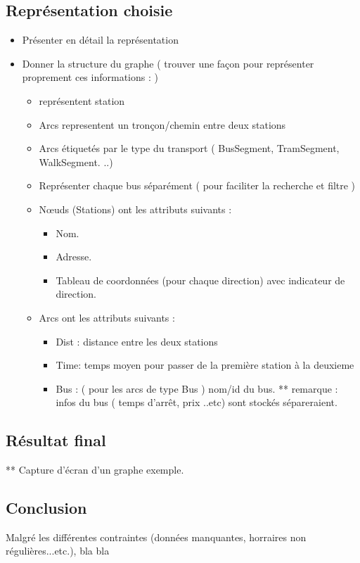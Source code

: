 \subsection{Représentation choisie}
	\begin{itemize}
	\item Présenter en détail la représentation
	\item Donner la structure du graphe ( trouver une façon pour représenter proprement ces informations : )
	\begin{itemize}
		 \item  représentent station
		 \item Arcs representent un tronçon/chemin entre deux stations
		 \item Arcs étiquetés par le type du transport ( BusSegment, TramSegment, WalkSegment. ..) 
		 \item Représenter chaque bus séparément ( pour faciliter la recherche et filtre ) 
		 \item Nœuds (Stations) ont les attributs suivants : 
		 \begin{itemize}
		 	\item Nom.
		 	\item Adresse.
		 	\item Tableau de coordonnées (pour chaque direction) avec indicateur de direction.
		 \end{itemize}
		 \item Arcs ont les attributs suivants :
		 \begin{itemize}
		 		\item Dist : distance entre les deux stations
		 		\item Time: temps moyen pour passer de la première station à la deuxieme
		 		\item Bus : ( pour les arcs de type Bus ) nom/id du bus.
		 		** remarque : infos du bus ( temps d'arrêt, prix ..etc) sont stockés sépareraient.
		 \end{itemize}
	\end{itemize}
	\end{itemize}

\subsection{Résultat final}
	** Capture d'écran d'un graphe exemple.

\subsection{Conclusion}

Malgré les différentes contraintes (données manquantes, horraires non régulières...etc.), bla bla 